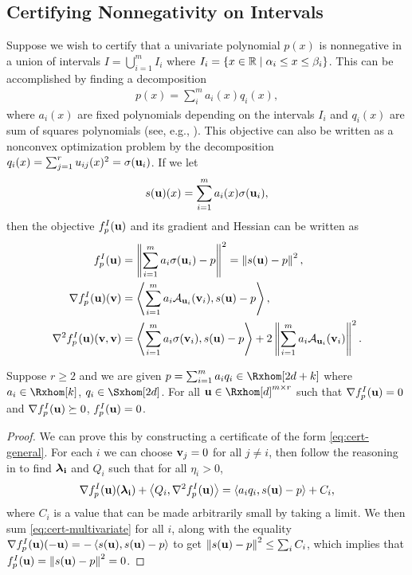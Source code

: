 \documentclass[final,onefignum,onetabnum]{siamart220329}
\begin{document}
\subsection{Certifying Nonnegativity on Intervals}
Suppose we wish to certify that a univariate polynomial $p(x)$ is nonnegative in
a union of intervals $I = \bigcup_{i=1}^m I_i$ where
$I_i = \{x \in \mathbb{R} \mid \alpha_i \le x \le \beta_i\}$. This can be accomplished
by finding a decomposition
\begin{align*}
  p(x) = \sum_i^m a_i(x) q_i(x),
\end{align*}
where $a_i(x)$ are fixed polynomials depending on the intervals $I_i$ and
$q_i(x)$ are sum of squares polynomials (see, e.g., \cite[Theorem
3.72]{blekherman_semidefinite_2013}). This objective can also be written as a
nonconvex optimization problem by the decomposition
$q_i(x) = \sum_{j=1}^r u_{ij}(x)^2 = \sigma(\boldsymbol{\mathbf{u}}_i)$. If we let
\begin{align*}
  s(\boldsymbol{\mathbf{u}})(x) = \sum_{i=1}^m a_i(x) \sigma(\boldsymbol{\mathbf{u}}_i),
\end{align*}
then the objective $f^I_p(\boldsymbol{\mathbf{u}})$ and its gradient and Hessian can be written as
\begin{align*}
  f^I_p(\boldsymbol{\mathbf{u}})
  &= \left\lVert \sum_{i=1}^m a_i \sigma(\boldsymbol{\mathbf{u}}_i) - p \right\lVert^2 = \left\lVert s(\boldsymbol{\mathbf{u}})-p \right\lVert^2,\\
  \nabla f^I_p(\boldsymbol{\mathbf{u}})(\boldsymbol{\mathbf{v}})
  &= \left\langle \sum_{i=1}^m a_i \mathcal{A}_{\boldsymbol{\mathbf{u}}_i}(\boldsymbol{\mathbf{v}}_i), s(\boldsymbol{\mathbf{u}})-p \right\rangle, \\
  \nabla^2 f^I_p(\boldsymbol{\mathbf{u}})(\boldsymbol{\mathbf{v}},\boldsymbol{\mathbf{v}})
  &= \left\langle \sum_{i=1}^m a_i \sigma(\boldsymbol{\mathbf{v}}_i), s(\boldsymbol{\mathbf{u}})-p \right\rangle
    + 2\left\lVert \sum_{i=1}^m a_i \mathcal{A}_{\boldsymbol{\mathbf{u}}_i}(\boldsymbol{\mathbf{v}}_i) \right\lVert^2.
\end{align*}
\begin{corollary} \label{cor:intervals} Suppose $r \ge 2$ and we are given
  $p = \sum_{i=1}^m a_i q_i \in \Rxhom[2d+k]$ where $a_i \in \Rxhom[k]$,
  $q_i \in \Sxhom[2d]$. For all $\vecp{u} \in \Rxhom[d]^{m \times r}$ such that
  $\nabla f^I_p(\boldsymbol{\mathbf{u}}) = 0$ and $\nabla f^I_p(\boldsymbol{\mathbf{u}}) \succeq 0$,
  $f^I_p(\boldsymbol{\mathbf{u}}) = 0$.
\end{corollary}
\begin{proof}
  We can prove this by constructing a certificate of the form
  \eqref{eq:cert-general}. For each $i$ we can choose $\boldsymbol{\mathbf{v}}_j = 0$ for all
  $j \ne i$, then follow the reasoning in  to find
  $\boldsymbol{\mathbf{\lambda_i}}$ and $Q_i$ such that for all $\eta_i > 0$,
  \begin{align} \label{eq:cert-multivariate}
    \nabla f^I_p(\boldsymbol{\mathbf{u}})(\boldsymbol{\mathbf{\lambda_i}}) + \left\langle Q_i, \nabla^2 f^I_p(\boldsymbol{\mathbf{u}}) \right\rangle
    = \left\langle a_iq_i, s(\boldsymbol{\mathbf{u}})-p \right\rangle + C_i,
  \end{align}
  where $C_i$ is a value that can be made arbitrarily small by taking a
  limit. We then sum \eqref{eq:cert-multivariate} for all $i$, along with the
  equality
  $\nabla f^I_p(\boldsymbol{\mathbf{u}})(-\boldsymbol{\mathbf{u}}) = -\left\langle s(\boldsymbol{\mathbf{u}}), s(\boldsymbol{\mathbf{u}})-p \right\rangle$ to
  get $\left\lVert s(\boldsymbol{\mathbf{u}})-p \right\lVert^2 \le \sum_i C_i$, which implies that
  $f^I_p(\boldsymbol{\mathbf{u}}) = \left\lVert s(\boldsymbol{\mathbf{u}})-p \right\lVert^2 = 0$.
\end{proof}
\end{document}
